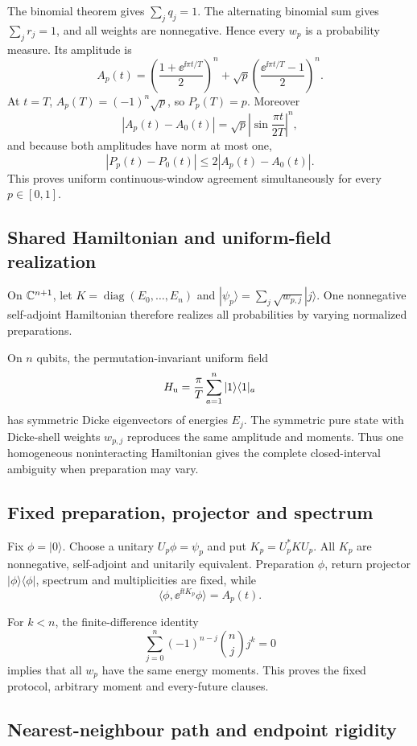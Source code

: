 The binomial theorem gives $\sum_jq_j=1$.  The alternating binomial sum
gives $\sum_jr_j=1$, and all weights are nonnegative.  Hence every $w_p$
is a probability measure.  Its amplitude is
\[
 A_p(t)=\left(\frac{1+\ee^{\ii\pi t/T}}2\right)^n
 +\sqrt p\left(\frac{\ee^{\ii\pi t/T}-1}2\right)^n.
\]
At $t=T$, $A_p(T)=(-1)^n\sqrt p$, so $P_p(T)=p$.  Moreover
\[
 |A_p(t)-A_0(t)|=\sqrt p
 \left|\sin\frac{\pi t}{2T}\right|^n,
\]
and because both amplitudes have norm at most one,
\[
 |P_p(t)-P_0(t)|\le2|A_p(t)-A_0(t)|.
\]
This proves uniform continuous-window agreement simultaneously for every
$p\in[0,1]$.

\subsection{Shared Hamiltonian and uniform-field realization}

On $\mathbb C^{n+1}$, let $K=\operatorname{diag}(E_0,\ldots,E_n)$ and
$|\psi_p\rangle=\sum_j\sqrt{w_{p,j}}|j\rangle$.  One nonnegative
self-adjoint Hamiltonian therefore realizes all probabilities by varying
normalized preparations.

On $n$ qubits, the permutation-invariant uniform field
\[
 H_{\rm u}=\frac\pi T\sum_{a=1}^n|1\rangle\langle1|_a
\]
has symmetric Dicke eigenvectors of energies $E_j$.  The symmetric pure
state with Dicke-shell weights $w_{p,j}$ reproduces the same amplitude and
moments.  Thus one homogeneous noninteracting Hamiltonian gives the complete
closed-interval ambiguity when preparation may vary.

\subsection{Fixed preparation, projector and spectrum}

Fix $\phi=|0\rangle$.  Choose a unitary $U_p\phi=\psi_p$ and put
$K_p=U_p^*KU_p$.  All $K_p$ are nonnegative, self-adjoint and unitarily
equivalent.  Preparation $\phi$, return projector
$|\phi\rangle\langle\phi|$, spectrum and multiplicities are fixed, while
\[
 \langle\phi,\ee^{\ii tK_p}\phi\rangle=A_p(t).
\]

For $k<n$, the finite-difference identity
\[
 \sum_{j=0}^n(-1)^{n-j}\binom{n}{j}j^k=0
\]
implies that all $w_p$ have the same energy moments.  This proves the fixed
protocol, arbitrary moment and every-future clauses.

\subsection{Nearest-neighbour path and endpoint rigidity}

